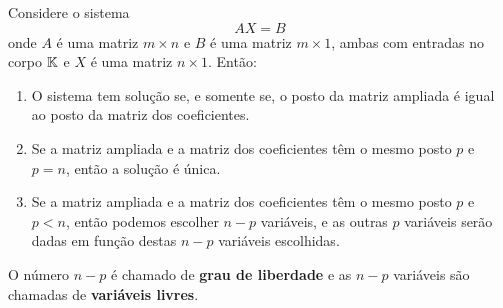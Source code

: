 \begin{teorema}
	Considere o sistema
	\[
		AX = B
	\]
	onde $A$ \'e uma matriz $m \times n$ e $B$ \'e uma matriz $m \times 1$, ambas com entradas no corpo $\mathbb{K}$ e $X$ \'e uma matriz $n \times 1$. Ent\~ao:
	\begin{enumerate}[label={\roman*})]
		\item O sistema tem solu\c{c}\~ao se, e somente se, o posto da matriz ampliada \'e igual ao posto da matriz dos coeficientes.

		\item Se a matriz ampliada e a matriz dos coeficientes t\^em o mesmo posto $p$ e $p = n$, ent\~ao a solu\c{c}\~ao \'e \'unica.

		\item Se a matriz ampliada e a matriz dos coeficientes t\^em o mesmo posto $p$ e $p < n$, ent\~ao podemos escolher $n - p$ vari\'aveis, e as outras $p$ vari\'aveis ser\~ao dadas em fun\c{c}\~ao destas $n - p$ vari\'aveis escolhidas.
	\end{enumerate}
	O n\'umero $n - p$ \'e chamado de \textbf{grau de liberdade} e as $n - p$ vari\'aveis s\~ao chamadas de \textbf{vari\'aveis livres}.
\end{teorema}

